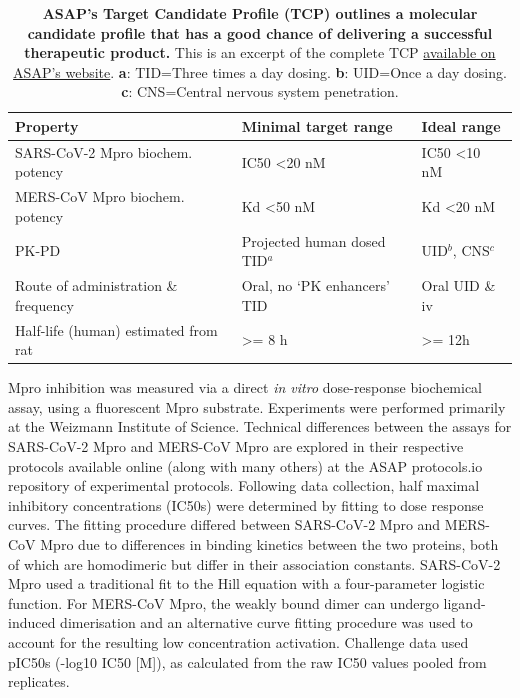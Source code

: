 \documentclass[journal=jcim,manuscript=article]{achemso}
\begin{document}
\begin{table}[]
\begin{tabular}{lll}
Property & Minimal target range & Ideal range \\ \hline
SARS-CoV-2 Mpro biochem. potency & IC50 \textless 20 nM & IC50 \textless 10 nM \\
MERS-CoV Mpro biochem. potency & Kd \textless 50 nM & Kd \textless 20 nM \\
PK-PD & Projected human dosed TID$^{a}$ & UID$^{b}$, CNS$^{c}$ \\
Route of administration \& frequency & Oral, no ‘PK enhancers’ TID & Oral UID \& iv \\
Half-life (human) estimated from rat & \textgreater{}= 8 h & \textgreater{}= 12h
\end{tabular}
\caption{\textbf{ASAP's Target Candidate Profile (TCP) outlines a molecular candidate profile that has a good chance of delivering a successful therapeutic product.} This is an excerpt of the complete TCP \href{https://docs.google.com/presentation/d/1uZht18ZJnHuwMtwxY4prDBSl4SFMK-ics4ERhDgiJ2s/edit?slide=id.g285bac68500_0_227#slide=id.g285bac68500_0_227}{available on ASAP's website}. \textbf{a}: TID=Three times a day dosing. \textbf{b}: UID=Once a day dosing. \textbf{c}: CNS=Central nervous system penetration.}
\label{table_tcp}
\end{table}
Mpro inhibition was measured via a direct \textit{in vitro} dose-response biochemical assay, using a fluorescent Mpro substrate. Experiments were performed primarily at the Weizmann Institute of Science. Technical differences between the assays for SARS-CoV-2 Mpro\cite{sars_mpro_dose_response_protocol} and MERS-CoV Mpro\cite{mers_mpro_dose_response_protocol} are explored in their respective protocols available online (along with many others) at the ASAP protocols.io repository of experimental protocols\cite{asap_protocols_io}. Following data collection, half maximal inhibitory concentrations (IC50s) were determined by fitting to dose response curves. The fitting procedure differed between SARS-CoV-2 Mpro and MERS-CoV Mpro due to differences in binding kinetics between the two proteins, both of which are homodimeric but differ in their association constants. SARS-CoV-2 Mpro used a traditional fit to the Hill equation\cite{Hill_eq_1910} with a four-parameter logistic function. For MERS-CoV Mpro, the weakly bound dimer can undergo ligand-induced dimerisation and an alternative curve fitting procedure was used to account for the resulting low concentration activation.\cite{la_kang_minh_2025} Challenge data used pIC50s (-log10 IC50 [M]), as calculated from the raw IC50 values pooled from replicates. 
\end{document}
